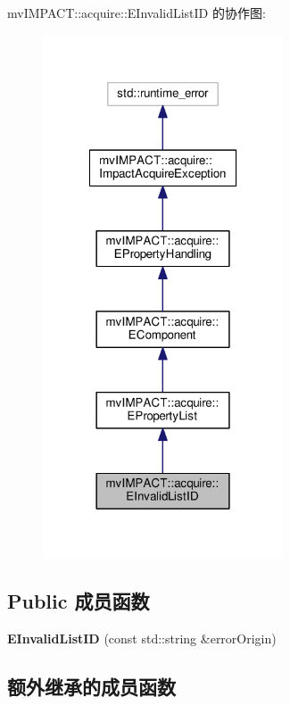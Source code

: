 mv\+I\+M\+P\+A\+C\+T\+:\+:acquire\+:\+:E\+Invalid\+List\+I\+D 的协作图\+:
\nopagebreak
\begin{figure}[H]
\begin{center}
\leavevmode
\includegraphics[width=202pt]{classmv_i_m_p_a_c_t_1_1acquire_1_1_e_invalid_list_i_d__coll__graph}
\end{center}
\end{figure}
\subsection*{Public 成员函数}
\begin{DoxyCompactItemize}
\item 
\hypertarget{classmv_i_m_p_a_c_t_1_1acquire_1_1_e_invalid_list_i_d_af03e3ea993f1df7ad78ed2487b2789ff}{{\bfseries E\+Invalid\+List\+I\+D} (const std\+::string \&error\+Origin)}\label{classmv_i_m_p_a_c_t_1_1acquire_1_1_e_invalid_list_i_d_af03e3ea993f1df7ad78ed2487b2789ff}

\end{DoxyCompactItemize}
\subsection*{额外继承的成员函数}


